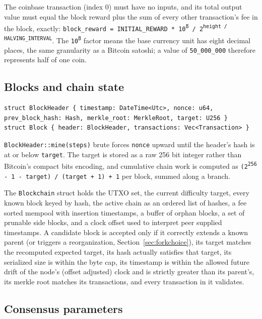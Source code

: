 \documentclass[11pt]{article}
\newcommand{\code}[1]{\texttt{#1}}
\begin{document}
The coinbase transaction (index 0) must have no inputs, and its total output value must equal the block reward plus the sum of every other transaction's fee in the block, exactly: \code{block\_reward = INITIAL\_REWARD * 10\textsuperscript{8} / 2\textsuperscript{height / HALVING\_INTERVAL}}. The \code{10\textsuperscript{8}} factor means the base currency unit has eight decimal places, the same granularity as a Bitcoin satoshi; a value of \code{50\_000\_000} therefore represents half of one coin.

\subsection{Blocks and chain state}

\begin{lstlisting}
struct BlockHeader { timestamp: DateTime<Utc>, nonce: u64, prev_block_hash: Hash, merkle_root: MerkleRoot, target: U256 }
struct Block { header: BlockHeader, transactions: Vec<Transaction> }
\end{lstlisting}

\code{BlockHeader::mine(steps)} brute forces \code{nonce} upward until the header's hash is at or below \code{target}. The target is stored as a raw 256 bit integer rather than Bitcoin's compact bits encoding, and cumulative chain work is computed as \code{(2\textsuperscript{256} - 1 - target) / (target + 1) + 1} per block, summed along a branch.

The \code{Blockchain} struct holds the UTXO set, the current difficulty target, every known block keyed by hash, the active chain as an ordered list of hashes, a fee sorted mempool with insertion timestamps, a buffer of orphan blocks, a set of prunable side blocks, and a clock offset used to interpret peer supplied timestamps. A candidate block is accepted only if it correctly extends a known parent (or triggers a reorganization, Section~\ref{sec:forkchoice}), its target matches the recomputed expected target, its hash actually satisfies that target, its serialized size is within the byte cap, its timestamp is within the allowed future drift of the node's (offset adjusted) clock and is strictly greater than its parent's, its merkle root matches its transactions, and every transaction in it validates.

\subsection{Consensus parameters}
\end{document}
